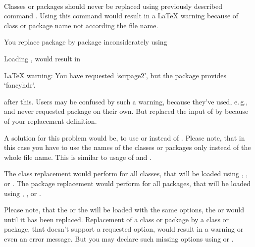 \begin{Declaration}
                      \\
\end{Declaration}%
%
%
Classes or packages
should never be replaced using previously described command
. Using this command would result in a \LaTeX{} warning
because of class or package name not according the file name.
\begin{Example}
  You replace package  by package 
  inconsiderately using
\begin{lstcode}
\end{lstcode}
  Loading , would result in
\begin{lstcode}
  LaTeX warning: You have requested `scrpage2',
                 but the package provides `fancyhdr'.
\end{lstcode}
  after this. Users may be confused by such a warning, because they've used,
  e.\,g.,  and never requested package
   on their own. But  replaced the input
  of  by  because of your replacement
  definition.
\end{Example}
A solution for this problem would be, to use  or
 instead of . Please note, that in
this case you have to use the names of the classes or packages only instead of
the whole file name. This is similar to usage of  and
.

The class replacement would perform for all classes, that will be loaded using
, , or . The
package replacement would perform for all packages, that will be loaded using
, , or
.

Please note, that the  or the
 will be loaded with the same options, the
 or  would until it has been
replaced. Replacement of a class or package by a class or package, that
doesn't support a requested option, would result in a warning or even an error
message. But you may declare such missing options using  or
.

